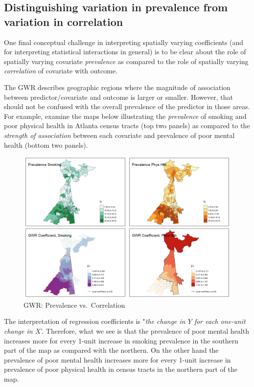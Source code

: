 \documentclass[
]{book}
\begin{document}
\hypertarget{distinguishing-variation-in-prevalence-from-variation-in-correlation}{%
\subsection{\texorpdfstring{Distinguishing variation in \textbf{prevalence} from variation in \textbf{correlation}}{Distinguishing variation in prevalence from variation in correlation}}\label{distinguishing-variation-in-prevalence-from-variation-in-correlation}}

One final conceptual challenge in interpreting spatially varying coefficients (and for interpreting statistical interactions in general) is to be clear about the role of spatially varying covariate \emph{prevalence} as compared to the role of spatially varying \emph{correlation} of covariate with outcome.

The GWR describes geographic regions where the magnitude of association between predictor/covariate and outcome is larger or smaller. However, that should not be confused with the overall prevalence of the predictor in those areas. For example, examine the maps below illustrating the \emph{prevalence} of smoking and poor physical health in Atlanta census tracts (top two panels) as compared to the \emph{strength of association} between each covariate and prevalence of poor mental health (bottom two panels).

\begin{figure}
\centering
\includegraphics{images/gwr-prevalence.png}
\caption{\label{fig:unnamed-chunk-286}GWR: Prevalence vs.~Correlation}
\end{figure}

The interpretation of regression coefficients is "\emph{the change in \(Y\) for each one-unit change in \(X\)}'. Therefore, what we see is that the prevalence of poor mental health increases more for every 1-unit increase in smoking prevalence in the southern part of the map as compared with the northern. On the other hand the prevalence of poor mental health increases more for every 1-unit increase in prevalence of poor physical health in census tracts in the northern part of the map.
\end{document}
